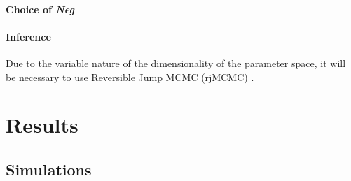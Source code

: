 \documentclass{report}
\theoremstyle{definition}
\begin{document}
\subsubsection{Choice of \textit{Neg}}
\subsubsection{Inference}
Due to the variable nature of the dimensionality of the parameter space, it will be necessary to use Reversible Jump MCMC (rjMCMC) \cite{fan_reversible_2010,green_reversible_1995}.
\chapter{Results}
\section{Simulations}
\end{document}
